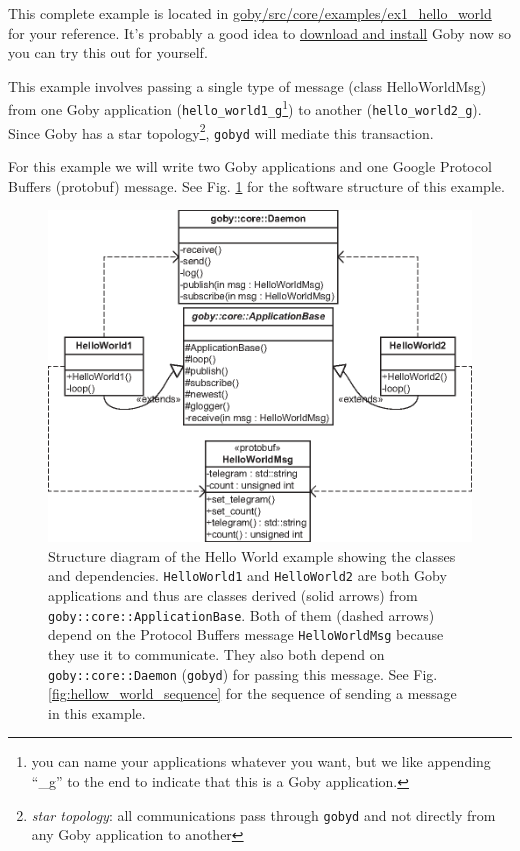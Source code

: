 \documentclass[11pt, letterpaper]{article}
\begin{document}
This complete example is located in \href{http://bazaar.launchpad.net/~goby-dev/goby/trunk/files/head:/src/core/examples/ex1_hello_world}{goby/src/core/examples/ex1\_hello\_world} for your reference. It's probably a good idea to \href{http://gobysoft.com/doc}{download and install} Goby now so you can try this out for yourself.

This example involves passing a single type of message (class HelloWorldMsg) from one Goby application (\texttt{hello\_world1\_g}\footnote{you can name your applications whatever you want, but we like appending ``\_g'' to the end to indicate that this is a Goby application.}) to another (\texttt{hello\_world2\_g}). Since Goby has a star topology\footnote{\textit{star topology}: all communications pass through \texttt{gobyd} and not directly from any Goby application to another}, \texttt{gobyd} will mediate this transaction.

For this example we will write two Goby applications and one Google Protocol Buffers (protobuf) message. See Fig. \ref{fig:hellow_world_structure} for the software structure of this example.

\begin{figure}
\centering
\includegraphics[scale=0.9]{hello_world_structure}
\caption{Structure diagram of the Hello World example showing the classes and dependencies. \texttt{HelloWorld1} and \texttt{HelloWorld2} are both Goby applications and thus are classes derived (solid arrows) from \texttt{goby::core::ApplicationBase}. Both of them (dashed arrows) depend on the Protocol Buffers message \texttt{HelloWorldMsg} because they use it to communicate. They also both depend on \texttt{goby::core::Daemon} (\texttt{gobyd}) for passing this message. See Fig. \ref{fig:hellow_world_sequence} for the sequence of sending a message in this example.}
\label{fig:hellow_world_structure}
\end{figure}
\end{document}
